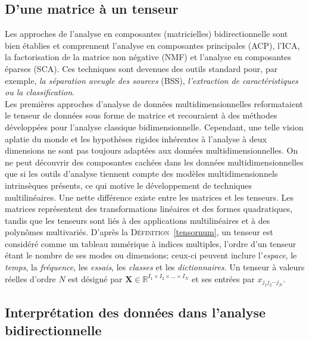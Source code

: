 \documentclass[11pt,a4paper,oneside]{book}
\def\RItn{\mathbb{R}^{I_1 \times I_2 \times \ldots \times I_N}}
\newcommand{\mbf}[1]{\mathbf{#1}}
\newcommand{\defref}[1]{\textsc{Définition}~\ref{#1}}
\begin{document}
\subsection{D'une matrice à un tenseur}
Les approches de l'analyse en composantes (matricielles) bidirectionnelle sont bien établies et comprennent l'analyse en composantes principales (ACP), l'ICA, la factorisation de la matrice non négative (NMF) et l'analyse en composantes éparses (SCA). Ces techniques sont devenues des outils standard pour, par exemple, \textit{la séparation aveugle des sources} (BSS), \textit{l'extraction de caractéristiques ou la classification}. \\
Les premières approches d'analyse de données multidimensionnelles reformataient le tenseur de données sous forme de matrice et recouraient à des méthodes développées pour l'analyse classique bidimensionnelle. Cependant, une telle vision aplatie du monde et les hypothèses rigides inhérentes à l'analyse à deux dimensions ne sont pas toujours adaptées aux données multidimensionnelles. On ne peut découvrir des composantes cachées dans les données multidimensionnelles que si les outils d'analyse tiennent compte des modèles multidimensionnels intrinsèques présents, ce qui motive le développement de techniques multilinéaires. Une nette différence existe entre les matrices et les tenseurs. Les matrices représentent des transformations linéaires et des formes quadratiques, tandis que les tenseurs sont liés à des applications multilinéaires et à des polynômes multivariés.
 D'après la \defref{tensornum}, un tenseur est considéré comme un tableau numérique à indices multiples, l'ordre d'un tenseur étant le nombre de ses modes ou dimensions; ceux-ci peuvent inclure l'\textit{espace}, le \textit{temps}, la \textit{fréquence}, les \textit{essais}, les \textit{classes} et les \textit{dictionnaires}. Un tenseur à valeurs réelles d'ordre $ N $ est désigné par $ \mbf{X}\in\RItn $ et ses entrées par $ x_{j_{1}j_{2}\cdots j_{N}} $.
 \subsection{Interprétation des données dans l'analyse bidirectionnelle}
 
\end{document}
